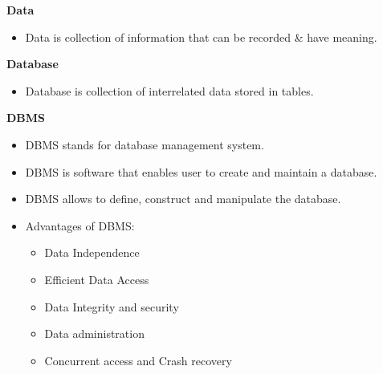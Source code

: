 
\setlength{\columnsep}{3pt}
\begin{flushleft}

	\textbf{Data}
	\begin{itemize}
		\item Data is collection of information that can be recorded \& have meaning.
	\end{itemize}
	
	\textbf{Database}
	\begin{itemize}
		\item Database is collection of interrelated data stored in tables.
	\end{itemize}

	\newpage
	\textbf{DBMS}
	\begin{itemize}
		\item DBMS stands for database management system.
		\item DBMS is software that enables user to create and maintain a database. 
		\item DBMS allows to define, construct and manipulate the database.
		\item Advantages of DBMS:
		\begin{itemize}
			\item Data Independence
			\item Efficient Data Access
			\item Data Integrity and security
			\item Data administration
			\item Concurrent access and Crash recovery
		\end{itemize}
	\end{itemize}
	
\end{flushleft}






